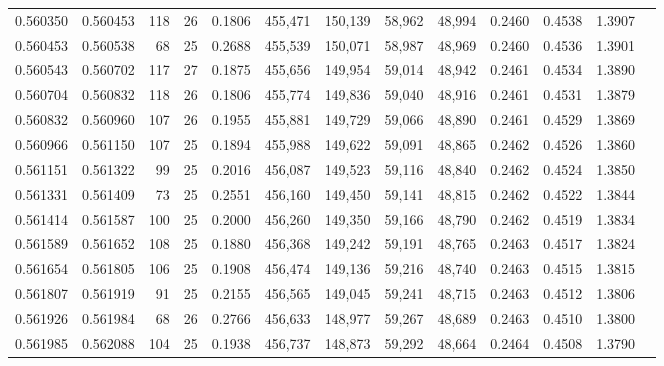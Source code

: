 \begin{tabular}{rrrrrrrrrrrrr}
0.560350 & 0.560453 & 118 &  26 &                                     0.1806 & 455,471 & 150,139 &  58,962 &  48,994 & 0.2460 & 0.4538 & 1.3907 \\
0.560453 & 0.560538 &  68 &  25 &                                     0.2688 & 455,539 & 150,071 &  58,987 &  48,969 & 0.2460 & 0.4536 & 1.3901 \\
0.560543 & 0.560702 & 117 &  27 &                                     0.1875 & 455,656 & 149,954 &  59,014 &  48,942 & 0.2461 & 0.4534 & 1.3890 \\
0.560704 & 0.560832 & 118 &  26 &                                     0.1806 & 455,774 & 149,836 &  59,040 &  48,916 & 0.2461 & 0.4531 & 1.3879 \\
0.560832 & 0.560960 & 107 &  26 &                                     0.1955 & 455,881 & 149,729 &  59,066 &  48,890 & 0.2461 & 0.4529 & 1.3869 \\
0.560966 & 0.561150 & 107 &  25 &                                     0.1894 & 455,988 & 149,622 &  59,091 &  48,865 & 0.2462 & 0.4526 & 1.3860 \\
0.561151 & 0.561322 &  99 &  25 &                                     0.2016 & 456,087 & 149,523 &  59,116 &  48,840 & 0.2462 & 0.4524 & 1.3850 \\
0.561331 & 0.561409 &  73 &  25 &                                     0.2551 & 456,160 & 149,450 &  59,141 &  48,815 & 0.2462 & 0.4522 & 1.3844 \\
0.561414 & 0.561587 & 100 &  25 &                                     0.2000 & 456,260 & 149,350 &  59,166 &  48,790 & 0.2462 & 0.4519 & 1.3834 \\
0.561589 & 0.561652 & 108 &  25 &                                     0.1880 & 456,368 & 149,242 &  59,191 &  48,765 & 0.2463 & 0.4517 & 1.3824 \\
0.561654 & 0.561805 & 106 &  25 &                                     0.1908 & 456,474 & 149,136 &  59,216 &  48,740 & 0.2463 & 0.4515 & 1.3815 \\
0.561807 & 0.561919 &  91 &  25 &                                     0.2155 & 456,565 & 149,045 &  59,241 &  48,715 & 0.2463 & 0.4512 & 1.3806 \\
0.561926 & 0.561984 &  68 &  26 &                                     0.2766 & 456,633 & 148,977 &  59,267 &  48,689 & 0.2463 & 0.4510 & 1.3800 \\
0.561985 & 0.562088 & 104 &  25 &                                     0.1938 & 456,737 & 148,873 &  59,292 &  48,664 & 0.2464 & 0.4508 & 1.3790 \\

\end{tabular}
